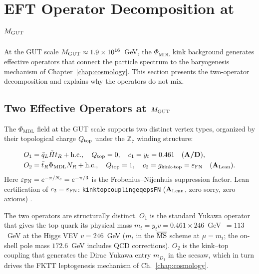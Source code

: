 \documentclass[11pt,openany]{book}
\theoremstyle{remark}
\newcommand{\PHIMDL}{\Phi_{\mathrm{MDL}}}
\newcommand{\ZS}{\mathbb{Z}_7}
\newcommand{\lean}[1]{%
  \penalty-100
  \begingroup\def\_{\textunderscore\allowbreak}\texttt{#1}\endgroup}
\newcommand{\Nc}{N_c}
\newcommand{\CatAL}{\ensuremath{\textbf{A}_{\rm Lean}}}
\newcommand{\CatAD}{\textbf{A/D}}
\begin{document}
\medskip
\section{EFT Operator Decomposition at $M_{\rm GUT}$}
\label{sec:eft_gut}

At the GUT scale $M_{\rm GUT} \approx 1.9\times10^{16}$~GeV, the $\PHIMDL$ kink
background generates effective operators that connect the particle spectrum to the
baryogenesis mechanism of Chapter~\ref{chap:cosmology}.  This section presents the
two-operator decomposition and explains why the operators do not mix.

\subsection*{Two Effective Operators at $M_{\rm GUT}$}

The $\PHIMDL$ field at the GUT scale supports two distinct vertex types, organized
by their topological charge $Q_{\rm top}$ under the $\ZS$ winding structure:

\begin{tcolorbox}[colback=green!5,colframe=green!50!black,title={EFT Operator Decomposition at $M_{\rm GUT}$ (\CatAD)}]
\begin{align*}
O_1 &= \bar{q}_L \tilde{H} t_R + \text{h.c.},\quad Q_{\rm top} = 0,
  \quad c_1 = y_t = 0.461 \quad (\CatAD), \\
O_2 &= \bar{t}_R \PHIMDL N_R + \text{h.c.},\quad Q_{\rm top} = 1,
  \quad c_2 = g_{\rm kink\text{-}top} = \varepsilon_{\rm FN} \quad (\CatAL).
\end{align*}
Here $\varepsilon_{\rm FN} = e^{-\pi/\Nc} = e^{-\pi/3}$ is the Frobenius--Nijenhuis
suppression factor.  Lean certification of $c_2 = \varepsilon_{\rm FN}$:
\lean{kink\_top\_coupling\_eq\_eps\_FN} (\CatAL, zero sorry, zero axioms)
\cite{SpivackGTECosmology}.
\end{tcolorbox}

The two operators are structurally distinct.  $O_1$ is the standard Yukawa operator
that gives the top quark its physical mass $m_t = y_t v = 0.461 \times 246$~GeV~$= 113$~GeV
at the Higgs VEV $v = 246$~GeV ($m_t$ in the $\overline{\rm MS}$ scheme at $\mu=m_t$;
the on-shell pole mass $172.6$~GeV includes QCD corrections).  $O_2$ is the kink--top
coupling that generates the Dirac Yukawa entry $m_{D_1}$ in the seesaw, which in turn
drives the FKTT leptogenesis mechanism of Ch.~\ref{chap:cosmology}.
\end{document}
